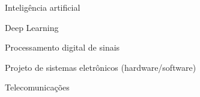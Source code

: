 

\begin{cvinterests}

  \cvinterest
    {Inteligência artificial} %

  \cvinterest
    {Deep Learning} %

  \cvinterest
    {Processamento digital de sinais} %

  \cvinterest
    {Projeto de sistemas eletrônicos (hardware/software)} %

  \cvinterest
    {Telecomunicações} %

\end{cvinterests}
